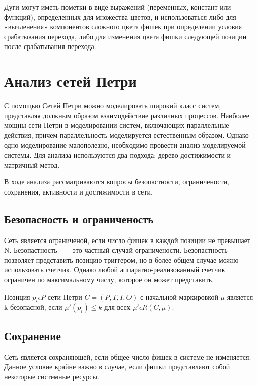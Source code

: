 Дуги могут иметь пометки в виде выражений (переменных, констант или функций), определенных для множества цветов, и использоваться либо для «вычленения» компонентов сложного цвета фишек при определении условия срабатывания перехода, либо для изменения цвета фишки следующей позиции после срабатывания перехода. \cite{Kristensen}

\section{Анализ сетей Петри}

С помощью Сетей Петри можно моделировать широкий класс систем, представляя должным образом взаимодействие различных процессов. Наиболее мощны сети Петри в моделировании систем, включающих параллельные действия, причем параллельность моделируется естественным образом. Однако одно моделирование малополезно, необходимо провести анализ моделируемой системы. Для анализа используются два подхода: дерево достижимости и матричный метод.

В ходе анализа рассматриваются вопросы безопастности, ограничености, сохранения, активности и достижимости в сети.
\subsection*{Безопасность и ограниченость}
Сеть является ограниченой, если число фишек в каждой позиции не превышает N. Безопастность ~--- это частный случай ограничености. Безопастность позволяет представить позицию триггером, но в более общем случае можно использовать счетчик. Однако любой аппаратно-реализованный счетчик ограничен по максимальному числу, которое он может представить.

Позиция $ p_{i} \epsilon P $ сети Петри $ C = (P, T, I, O) $ с начальной маркировкой $ \mu $ является k-безопасной, если $ \mu'(p_{i}) \leqslant k $ для всех $ \mu' \epsilon R(C, \mu) $.

\subsection*{Сохранение}
Сеть является сохраняющей, если общее число фишек в системе не изменяется. Данное условие крайне важно в случае, если фишки представляют собой некоторые системные ресурсы.

